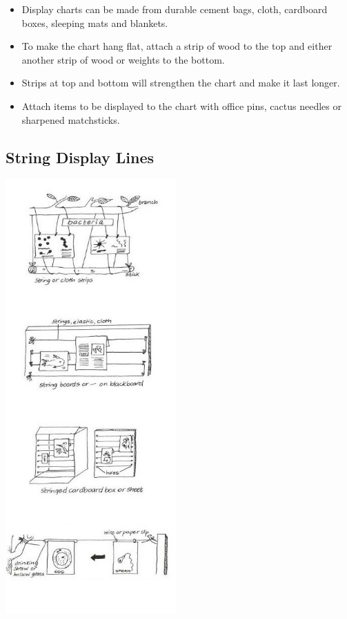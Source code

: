 \begin{multicols}{2}
\begin{itemize}
\item Display charts can be made
from durable cement bags,
cloth, cardboard boxes, sleeping
mats and blankets.
\item To make the chart hang flat,
attach a strip of wood to the
top and either another strip of
wood or weights to the bottom.
\item Strips at top and bottom will
strengthen the chart and make
it last longer.
\item Attach items to be displayed to
the chart with office pins, cactus
needles or sharpened
matchsticks.
\end{itemize}

%

\columnbreak

\subsection{String Display Lines}

\begin{center}
\includegraphics[width=0.49\textwidth]{./img/vso/string-display.jpg}
\end{center}


\end{multicols}
